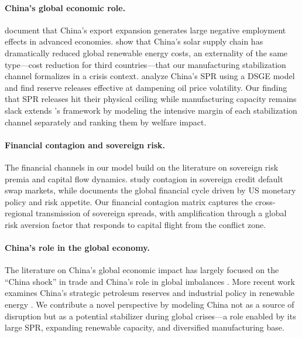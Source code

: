 \documentclass[12pt]{article}
\begin{document}
\paragraph{China's global economic role.} \citet{autor2013china} document that China's export expansion generates large negative employment effects in advanced economies. \citet{helveston2019china} show that China's solar supply chain has dramatically reduced global renewable energy costs, an externality of the same type---cost reduction for third countries---that our manufacturing stabilization channel formalizes in a crisis context. \citet{zhang2020china} analyze China's SPR using a DSGE model and find reserve releases effective at dampening oil price volatility. Our finding that SPR releases hit their physical ceiling while manufacturing capacity remains slack extends \citeauthor{zhang2020china}'s framework by modeling the intensive margin of each stabilization channel separately and ranking them by welfare impact.

\paragraph{Financial contagion and sovereign risk.} The financial channels in our model build on the literature on sovereign risk premia and capital flow dynamics. \citet{longstaff2011financial} study contagion in sovereign credit default swap markets, while \citet{rey2015dilemma} documents the global financial cycle driven by US monetary policy and risk appetite. Our financial contagion matrix captures the cross-regional transmission of sovereign spreads, with amplification through a global risk aversion factor that responds to capital flight from the conflict zone.

\paragraph{China's role in the global economy.} The literature on China's global economic impact has largely focused on the ``China shock'' in trade \citep{autor2013china} and China's role in global imbalances \citep{bernanke2005global}. More recent work examines China's strategic petroleum reserves \citep{zhang2020china} and industrial policy in renewable energy \citep{helveston2019china}. We contribute a novel perspective by modeling China not as a source of disruption but as a potential stabilizer during global crises---a role enabled by its large SPR, expanding renewable capacity, and diversified manufacturing base.
\end{document}
